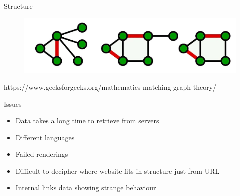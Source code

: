 \documentclass[10pt]{beamer}
\begin{document}
\begin{frame}{Structure}
\vspace{20mm}
\begin{figure}
\centering
\includegraphics[scale=0.3]{GRAPH-Matching2}
\end{figure}

\vspace{20mm}

\footnotesize https://www.geeksforgeeks.org/mathematics-matching-graph-theory/
\end{frame}

\begin{frame}{Issues}
\large
\begin{itemize}
\itemsep1.0em
\item Data takes a long time to retrieve from servers
\item Different languages
\item Failed renderings
\item Difficult to decipher where website fits in structure just from URL
\item Internal links data showing strange behaviour
\end{itemize}
\end{frame}
\end{document}
